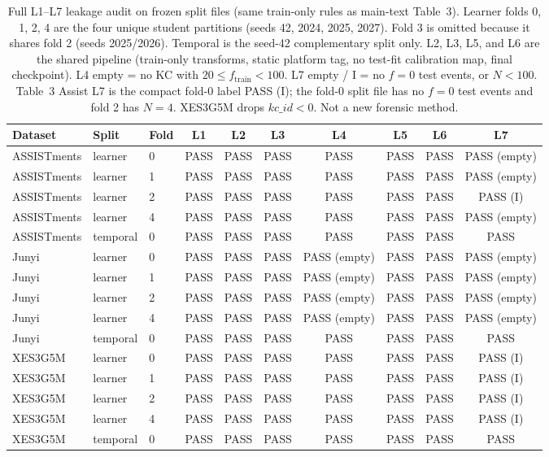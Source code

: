 \begin{table}[htbp]
\caption{Full L1--L7 leakage audit on frozen split files (same train-only rules as main-text Table~3). Learner folds 0, 1, 2, 4 are the four unique student partitions (seeds 42, 2024, 2025, 2027). Fold 3 is omitted because it shares fold 2 (seeds 2025/2026). Temporal is the seed-42 complementary split only. L2, L3, L5, and L6 are the shared pipeline (train-only transforms, static platform tag, no test-fit calibration map, final checkpoint). L4 empty = no KC with $20\le f_{\mathrm{train}}<100$. L7 empty / I = no $f=0$ test events, or $N<100$. Table~3 Assist L7 is the compact fold-0 label PASS (I); the fold-0 split file has no $f=0$ test events and fold 2 has $N=4$. XES3G5M drops $kc\_id<0$. Not a new forensic method.}
\label{tab:s10_leakage}
\centering
\scriptsize
\setlength{\tabcolsep}{3.2pt}
\begin{tabular}{lllccccccc}
\toprule
Dataset & Split & Fold & L1 & L2 & L3 & L4 & L5 & L6 & L7 \\
\midrule
ASSISTments & learner & 0 & PASS & PASS & PASS & PASS & PASS & PASS & PASS (empty) \\
ASSISTments & learner & 1 & PASS & PASS & PASS & PASS & PASS & PASS & PASS (empty) \\
ASSISTments & learner & 2 & PASS & PASS & PASS & PASS & PASS & PASS & PASS (I) \\
ASSISTments & learner & 4 & PASS & PASS & PASS & PASS & PASS & PASS & PASS (empty) \\
ASSISTments & temporal & 0 & PASS & PASS & PASS & PASS & PASS & PASS & PASS \\
Junyi & learner & 0 & PASS & PASS & PASS & PASS (empty) & PASS & PASS & PASS (empty) \\
Junyi & learner & 1 & PASS & PASS & PASS & PASS (empty) & PASS & PASS & PASS (empty) \\
Junyi & learner & 2 & PASS & PASS & PASS & PASS (empty) & PASS & PASS & PASS (empty) \\
Junyi & learner & 4 & PASS & PASS & PASS & PASS (empty) & PASS & PASS & PASS (empty) \\
Junyi & temporal & 0 & PASS & PASS & PASS & PASS & PASS & PASS & PASS \\
XES3G5M & learner & 0 & PASS & PASS & PASS & PASS & PASS & PASS & PASS (I) \\
XES3G5M & learner & 1 & PASS & PASS & PASS & PASS & PASS & PASS & PASS (I) \\
XES3G5M & learner & 2 & PASS & PASS & PASS & PASS & PASS & PASS & PASS (I) \\
XES3G5M & learner & 4 & PASS & PASS & PASS & PASS & PASS & PASS & PASS (I) \\
XES3G5M & temporal & 0 & PASS & PASS & PASS & PASS & PASS & PASS & PASS \\
\bottomrule
\end{tabular}
\end{table}

